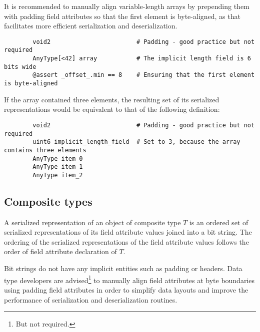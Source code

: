 \begin{remark}
    It is recommended to manually align variable-length arrays by prepending them with padding field attributes
    so that the first element is byte-aligned, as that facilitates more efficient serialization and deserialization.

    \begin{verbatim}
        void2                        # Padding - good practice but not required
        AnyType[<42] array           # The implicit length field is 6 bits wide
        @assert _offset_.min == 8    # Ensuring that the first element is byte-aligned
    \end{verbatim}

    If the array contained three elements,
    the resulting set of its serialized representations would be equivalent to that of the following definition:

    \begin{verbatim}
        void2                        # Padding - good practice but not required
        uint6 implicit_length_field  # Set to 3, because the array contains three elements
        AnyType item_0
        AnyType item_1
        AnyType item_2
    \end{verbatim}
\end{remark}

\subsection{Composite types}

A serialized representation of an object of composite type $T$ is an ordered set of serialized representations of
its field attribute values joined into a bit string.
The ordering of the serialized representations of the field attribute values follows the order
of field attribute declaration of $T$.

Bit strings do not have any implicit entities such as padding or headers.
Data type developers are advised\footnote{But not required.} to manually align field attributes at
byte boundaries using padding field attributes in order to simplify data layouts
and improve the performance of serialization and deserialization routines.

